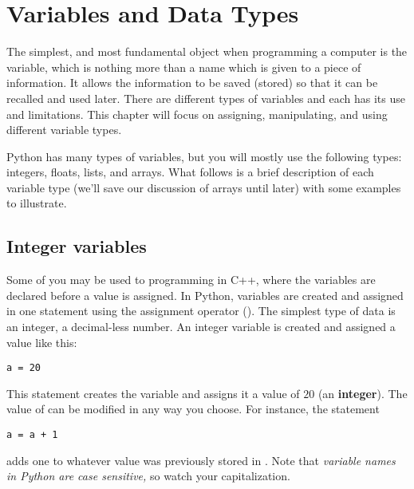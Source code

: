 \chapter{Variables and Data Types}
\label{chap:variablesDataTypes}


The simplest, and most fundamental object when programming a computer
is the variable, which is nothing more than a name which is given to a
piece of information. It allows the information to be saved (stored)
so that it can be recalled and used later.   There
are different types of variables and each has its use and
limitations.  This chapter will focus on assigning,
manipulating, and using different variable types.


Python has many types of variables, but you will mostly
use the following types: integers, floats, lists, and arrays.  What
follows is a brief description of each variable type (we'll save our
discussion of arrays until later) with some examples to illustrate.

\section{Integer variables}
Some of you may be used to programming in C++, where
the variables are declared before a value is assigned.  In Python,
variables are created and assigned in one statement using the
assignment operator (\code{=}).  The simplest type of data is an
integer, a decimal-less number.  An integer variable is created and
assigned a value like this:
\begin{Verbatim}
a = 20
\end{Verbatim}
This statement creates the variable  and assigns it a value of
$20$ (an \textbf{integer}).  The value of  can be modified in
any way you choose.  For instance, the statement
\begin{Verbatim}
a = a + 1
\end{Verbatim}
adds one to whatever value was previously stored in
.   Note that {\it variable names in Python
  are case sensitive,} so watch your capitalization.  





